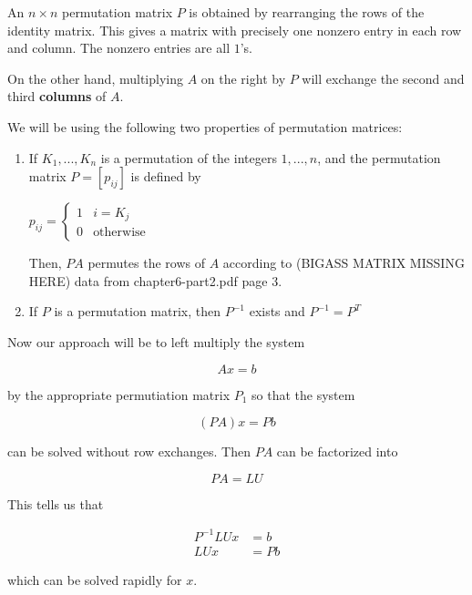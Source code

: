 An $n\times n$ permutation matrix $P$ is obtained by rearranging the rows of
the identity matrix. This gives a matrix with precisely one nonzero entry in
each row and column. The nonzero entries are all $1$'s.

On the other hand, multiplying $A$ on the right by $P$ will exchange the
second and third \textbf{columns} of $A$.

We will be using the following two properties of permutation matrices:

\begin{enumerate}
  \item If $K_1,...,K_n$ is a permutation of the integers $1,...,n$, and the
    permutation matrix $P=[p_{ij}]$ is defined by 

    \qquad $p_{ij}=\begin{cases}
      1 & i=K_j\\
      0 & \text{otherwise}
    \end{cases}$

    Then, $PA$ permutes the rows of $A$ according to (BIGASS MATRIX MISSING HERE)
    data from chapter6-part2.pdf page 3.
  \item If $P$ is a permutation matrix, then $P^{-1}$ exists and $P^{-1}=P^T$
\end{enumerate}

Now our approach will be to left multiply the system

\begin{equation*}
  Ax=b
\end{equation*}

by the appropriate permutiation matrix $P_1$ so that the system

\begin{equation*}
  (PA)x=Pb
\end{equation*}

can be solved without row exchanges. Then $PA$ can be factorized into

\begin{equation*}
  PA=LU
\end{equation*}

This tells us that

\begin{align*}
  P^{-1}LUx &= b \\
  LUx &= Pb
\end{align*}

which can be solved rapidly for $x$.



